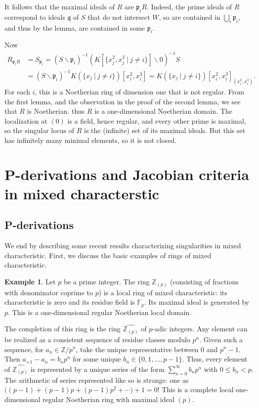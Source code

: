 \documentclass{amsart}[12pt]
\newcommand{\F}{\mathbb{F}}
\newcommand{\Z}{\mathbb{Z}}
\newcommand{\fp}{{\mathfrak p}}
\newcommand{\fq}{{\mathfrak q}}
\numberwithin{equation}{section}
\theoremstyle{plain} %
\theoremstyle{definition}
\newtheorem{ex}[equation]{Example}
\theoremstyle{remark}
\begin{document}
It follows that the maximal ideals of $R$ are $\fp_i R$. Indeed, the prime ideals of $R$ correspond to ideals $\fq$ of $S$ that do not intersect $W$, so are contained in $\bigcup_i \fp_i$, and thus by the lemma, are contained in some $\fp_i$.

Now \[ \begin{aligned} R_{\fp_i R} &= S_{\fp_i} = (S\smallsetminus \fp_i)^{-1}(K[\{x_j^2,x_j^3 \ | \ j\neq i\}]\smallsetminus 0)^{-1} S \\&= (S\smallsetminus \fp_i)^{-1} K(\{ x_j \ | \ j \neq i\}) [x_i^2,x_i^3] = K(\{ x_j \ | \ j \neq i\}) [x_i^2,x_i^3]_{(x_i^2,x_i^3)}.\end{aligned}\]
For each $i$, this is a Noetherian ring of dimension one that is not regular.  From the first lemma, and the observation in the proof of the second lemma, we see that $R$ is Noetherian. thus $R$ is a one-dimensional Noetherian domain. The localization at $(0)$ is a field, hence regular, and every other prime is maximal, so the singular locus of $R$ is the (infinite) set of its maximal ideals. But this set has infinitely many minimal elements, so it is not closed.

\section{P-derivations and Jacobian criteria in mixed characterstic}

\subsection{P-derivations}

We end by describing some recent results characterizing singularities in mixed characteristic. First, we discuss the basic examples of rings of mixed characteristic.

\begin{ex} Let $p$ be a prime integer. The ring $\Z_{(p)}$ (consisting of fractions with denominator coprime to $p$) is a local ring of mixed characteristic: its characteristic is zero and its residue field is $\F_p$. Its maximal ideal is generated by $p$. This is a one-dimensional regular Noetherian local domain.

The completion of this ring is the ring $\widehat{\Z_{(p)}}$ of $p$-adic integers. Any element can be realized as a consistent sequence of residue classes modulo $p^n$. Given such a sequence, for $a_n\in \Z/p^n$, take the unique representative between $0$ and $p^n-1$. Then $a_{+1} - a_{n} = b_n p^{n}$ for some unique $b_n\in \{0,1,\dots,p-1\}$. Thus, every element of $\widehat{\Z_{(p)}}$ is represented by a unique series of the form $\sum_{n=0}^\infty b_n p^{n}$ with $0\leq b_n <p$. The arithmetic of series represented like so is strange: one as $\big((p-1) + (p-1)p + (p-1) p^2 + \cdots\big) + 1 = 0$!
This is a complete local one-dimensional regular Noetherian ring with maximal ideal $(p)$.
\end{ex}
\end{document}
